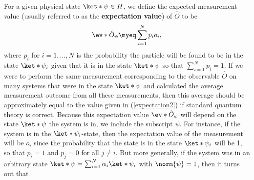 \documentclass[12pt]{report}
\begin{document}
For a given physical state $\ket*{\psi}\in H$, we define the expected measurement value (usually referred to as the \textbf{expectation value}) of $\hat{O}$ to be 
\begin{equation}\label{expectation2}
\ev*{\hat{O}}_\psi\myeq\sum_{i=1}^N p_io_i,
\end{equation}
where %
%
$p_i$  %
%
for $i=1,\ldots, N$ is the probability the particle will be found to be in the state $\ket*{\psi_i}$ given that it is in the state $\ket*{\psi}$ so that  $\sum_{i=1}^N p_i=1$. If we were to perform the same measurement corresponding to the observable $\hat{O}$ on many systems that were in the state $\ket*{\psi}$ and calculated the average measurement outcome from all these measurements, then this average should be approximately equal to the value given in (\ref{expectation2}) if  standard quantum theory is correct. Because this expectation value $\ev*{\hat{O}}_\psi$ will depend on the state $\ket*{\psi}$ the system is in, we include the subscript $\psi$. For instance, if the system is in the $\ket*{\psi_i}$-state, then the expectation value of the measurement will be $o_i$ since the probability that the state is in the state $\ket*{\psi_i}$ will be 1, so that $p_i=1$ and $p_j=0$ for all $j\neq i$. But more generally, if the system was in an arbitrary state $\ket*{\psi}=\sum_{i=1}^N \alpha_i\ket*{\psi_i}$ with $\norm{\psi}=1$, then it turns out that 
\end{document}
